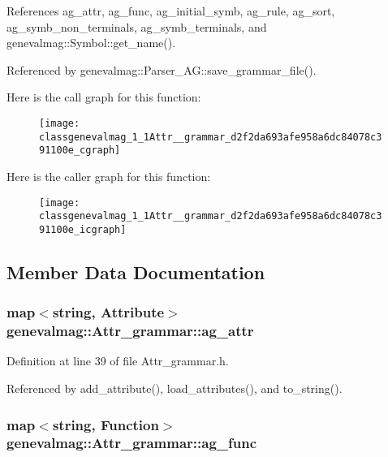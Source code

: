 References ag\_\-attr, ag\_\-func, ag\_\-initial\_\-symb, ag\_\-rule, ag\_\-sort, ag\_\-symb\_\-non\_\-terminals, ag\_\-symb\_\-terminals, and genevalmag::Symbol::get\_\-name().

Referenced by genevalmag::Parser\_\-AG::save\_\-grammar\_\-file().

Here is the call graph for this function:\nopagebreak
\begin{figure}[H]
\begin{center}
\leavevmode
\texttt{[image: classgenevalmag\_1\_1Attr\_\_grammar\_d2f2da693afe958a6dc84078c391100e\_cgraph]}
\end{center}
\end{figure}


Here is the caller graph for this function:\nopagebreak
\begin{figure}[H]
\begin{center}
\leavevmode
\texttt{[image: classgenevalmag\_1\_1Attr\_\_grammar\_d2f2da693afe958a6dc84078c391100e\_icgraph]}
\end{center}
\end{figure}


\subsection{Member Data Documentation}
\hypertarget{classgenevalmag_1_1Attr__grammar_f8eda41983da416b71568b230495cac3}{
\subsubsection[{ag\_\-attr}]{\setlength{\rightskip}{0pt plus 5cm}map$<$string, {\bf Attribute}$>$ {\bf genevalmag::Attr\_\-grammar::ag\_\-attr}}}
\label{classgenevalmag_1_1Attr__grammar_f8eda41983da416b71568b230495cac3}




Definition at line 39 of file Attr\_\-grammar.h.

Referenced by add\_\-attribute(), load\_\-attributes(), and to\_\-string().\hypertarget{classgenevalmag_1_1Attr__grammar_3ebc66b5f02a2c6806a6002dd09fc34f}{
\subsubsection[{ag\_\-func}]{\setlength{\rightskip}{0pt plus 5cm}map$<$string, {\bf Function}$>$ {\bf genevalmag::Attr\_\-grammar::ag\_\-func}}}
\label{classgenevalmag_1_1Attr__grammar_3ebc66b5f02a2c6806a6002dd09fc34f}




